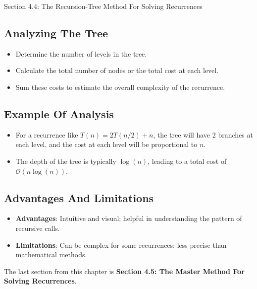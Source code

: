 \begin{notes}{Section 4.4: The Recursion-Tree Method For Solving Recurrences}
    \subsection*{Analyzing The Tree}

    \begin{itemize}
        \item Determine the number of levels in the tree.
        \item Calculate the total number of nodes or the total cost at each level.
        \item Sum these costs to estimate the overall complexity of the recurrence.
    \end{itemize}

    \subsection*{Example Of Analysis}

    \begin{itemize}
        \item For a recurrence like $T(n) = 2T(n / 2) + n$, the tree will have 2 branches at each level, and the cost at each level will be proportional to $n$.
        \item The depth of the tree is typically $\log{(n)}$, leading to a total cost of $\mathcal{O}(n \log{(n)})$.
    \end{itemize}

    \subsection*{Advantages And Limitations}

    \begin{itemize}
        \item \textbf{Advantages}: Intuitive and visual; helpful in understanding the pattern of recursive calls.
        \item \textbf{Limitations}: Can be complex for some recurrences; less precise than mathematical methods.
    \end{itemize}
\end{notes}

The last section from this chapter is \textbf{Section 4.5: The Master Method For Solving Recurrences}.

